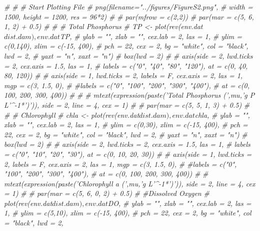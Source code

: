\documentclass[]{article}
\newenvironment{Shaded}{\begin{snugshade}}{\end{snugshade}}
\newcommand{\CommentTok}[1]{\textcolor[rgb]{0.56,0.35,0.01}{\textit{#1}}}
\begin{document}
\begin{Shaded}
\begin{Highlighting}[]
\CommentTok{# }
\CommentTok{# # Start Plotting File}
\CommentTok{# png(filename="../figures/FigureS2.png",}
\CommentTok{#     width = 1500, height = 1200, res = 96*2)}
\CommentTok{# }
\CommentTok{# par(mfrow = c(2,2))}
\CommentTok{# par(mar = c(5, 6, 1, 2) + 0.5)}
\CommentTok{# }
\CommentTok{# # Total Phosphorus}
\CommentTok{# TP <- plot(rev(env.dat$dist.dam), env.dat$TP, }
\CommentTok{#      ylab = "", xlab = "", cex.lab = 2, las = 1,}
\CommentTok{#      ylim = c(0,140), xlim = c(-15, 400),}
\CommentTok{#      pch = 22, cex = 2, bg = "white", col = "black", lwd = 2,}
\CommentTok{#      yaxt = "n", xaxt = "n")}
\CommentTok{# box(lwd = 2)}
\CommentTok{# }
\CommentTok{# axis(side = 2, lwd.ticks = 2, cex.axis = 1.5, las = 1,}
\CommentTok{#     labels = c("0", "40", "80", "120"), at = c(0, 40, 80, 120))}
\CommentTok{#                               }
\CommentTok{# axis(side = 1, lwd.ticks = 2,  labels = F, cex.axis = 2, las = 1, mgp = c(3, 1.5, 0),}
\CommentTok{#    #labels = c("0", "100", "200", "300", "400"), }
\CommentTok{#    at = c(0, 100, 200, 300, 400))}
\CommentTok{# }
\CommentTok{# }
\CommentTok{# mtext(expression(paste('Total Phosphorus (',mu,'g P L'^-1*')')), side = 2, line = 4, cex = 1)}
\CommentTok{# }
\CommentTok{# par(mar = c(5, 5, 1, 3) + 0.5)}
\CommentTok{# }
\CommentTok{# # Chlorophyll}
\CommentTok{# chla <- plot(rev(env.dat$dist.dam), env.dat$chla, }
\CommentTok{#      ylab = "", xlab = "", cex.lab = 2, las = 1,}
\CommentTok{#      ylim = c(0,30), xlim = c(-15, 400),}
\CommentTok{#      pch = 22, cex = 2, bg = "white", col = "black", lwd = 2,}
\CommentTok{#      yaxt = "n", xaxt = "n")}
\CommentTok{# box(lwd = 2)}
\CommentTok{# }
\CommentTok{# axis(side = 2, lwd.ticks = 2, cex.axis = 1.5, las = 1,}
\CommentTok{#     labels = c("0", "10", "20", "30"), at = c(0, 10, 20, 30))}
\CommentTok{# }
\CommentTok{# axis(side = 1, lwd.ticks = 2, labels = F, cex.axis = 2, las = 1, mgp = c(3, 1.5, 0),}
\CommentTok{#    #labels = c("0", "100", "200", "300", "400"), }
\CommentTok{#    at = c(0, 100, 200, 300, 400))}
\CommentTok{# }
\CommentTok{# mtext(expression(paste('Chlorophyll a (',mu,'g L'^-1*')')), side = 2, line = 4, cex = 1)}
\CommentTok{# }
\CommentTok{# par(mar = c(5, 6, 0, 2) + 0.5)}
\CommentTok{# #Dissolved Oxygen}
\CommentTok{# plot(rev(env.dat$dist.dam), env.dat$DO, }
\CommentTok{#      ylab = "", xlab = "", cex.lab = 2, las = 1,}
\CommentTok{#      ylim = c(5,10), xlim = c(-15, 400),}
\CommentTok{#      pch = 22, cex = 2, bg = "white", col = "black", lwd = 2,}

\end{Highlighting}
\end{Shaded}
\end{document}
